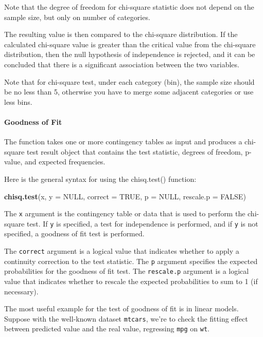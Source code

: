 \documentclass[
]{ctexart}
\newenvironment{Shaded}{\begin{snugshade}}{\end{snugshade}}
\newcommand{\AttributeTok}[1]{\textcolor[rgb]{0.13,0.29,0.53}{#1}}
\newcommand{\ConstantTok}[1]{\textcolor[rgb]{0.56,0.35,0.01}{#1}}
\newcommand{\FunctionTok}[1]{\textcolor[rgb]{0.13,0.29,0.53}{\textbf{#1}}}
\newcommand{\NormalTok}[1]{#1}
\begin{document}
Note that the degree of freedom for chi-square statistic does not depend
on the sample size, but only on number of categories.

The resulting value is then compared to the chi-square distribution. If
the calculated chi-square value is greater than the critical value from
the chi-square distribution, then the null hypothesis of independence is
rejected, and it can be concluded that there is a significant
association between the two variables.

Note that for chi-square test, under each category (bin), the sample
size should be no less than 5, otherwise you have to merge some adjacent
categories or use less bins.

\hypertarget{goodness-of-fit}{%
\paragraph{Goodness of Fit}\label{goodness-of-fit}}

The function takes one or more contingency tables as input and produces
a chi-square test result object that contains the test statistic,
degrees of freedom, p-value, and expected frequencies.

Here is the general syntax for using the chisq.test() function:

\begin{Shaded}
\begin{Highlighting}[]
\FunctionTok{chisq.test}\NormalTok{(x, }\AttributeTok{y =} \ConstantTok{NULL}\NormalTok{, }
           \AttributeTok{correct =} \ConstantTok{TRUE}\NormalTok{, }
           \AttributeTok{p =} \ConstantTok{NULL}\NormalTok{, }\AttributeTok{rescale.p =} \ConstantTok{FALSE}\NormalTok{)}
\end{Highlighting}
\end{Shaded}

The \texttt{x} argument is the contingency table or data that is used to
perform the chi-square test. If \texttt{y} is specified, a test for
independence is performed, and if \texttt{y} is not specified, a
goodness of fit test is performed.

The \texttt{correct} argument is a logical value that indicates whether
to apply a continuity correction to the test statistic. The \texttt{p}
argument specifies the expected probabilities for the goodness of fit
test. The \texttt{rescale.p} argument is a logical value that indicates
whether to rescale the expected probabilities to sum to 1 (if
necessary).

The most useful example for the test of goodness of fit is in linear
models. Suppose with the well-known dataset \texttt{mtcars}, we're to
check the fitting effect between predicted value and the real value,
regressing \texttt{mpg} on \texttt{wt}.
\end{document}
